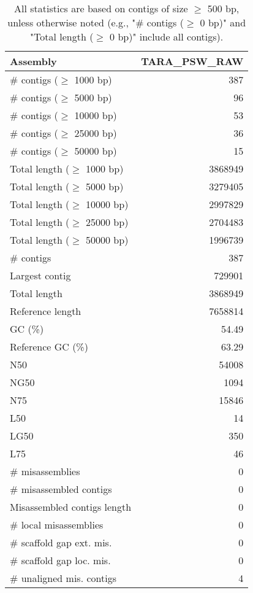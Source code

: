 \documentclass[12pt,a4paper]{article}
\begin{document}
\begin{table}[ht]
\begin{center}
\caption{All statistics are based on contigs of size $\geq$ 500 bp, unless otherwise noted (e.g., "\# contigs ($\geq$ 0 bp)" and "Total length ($\geq$ 0 bp)" include all contigs).}
\begin{tabular}{|l*{1}{|r}|}
\hline
Assembly & TARA\_PSW\_RAW \\ \hline
\# contigs ($\geq$ 1000 bp) & 387 \\ \hline
\# contigs ($\geq$ 5000 bp) & 96 \\ \hline
\# contigs ($\geq$ 10000 bp) & 53 \\ \hline
\# contigs ($\geq$ 25000 bp) & 36 \\ \hline
\# contigs ($\geq$ 50000 bp) & 15 \\ \hline
Total length ($\geq$ 1000 bp) & 3868949 \\ \hline
Total length ($\geq$ 5000 bp) & 3279405 \\ \hline
Total length ($\geq$ 10000 bp) & 2997829 \\ \hline
Total length ($\geq$ 25000 bp) & 2704483 \\ \hline
Total length ($\geq$ 50000 bp) & 1996739 \\ \hline
\# contigs & 387 \\ \hline
Largest contig & 729901 \\ \hline
Total length & 3868949 \\ \hline
Reference length & 7658814 \\ \hline
GC (\%) & 54.49 \\ \hline
Reference GC (\%) & 63.29 \\ \hline
N50 & 54008 \\ \hline
NG50 & 1094 \\ \hline
N75 & 15846 \\ \hline
L50 & 14 \\ \hline
LG50 & 350 \\ \hline
L75 & 46 \\ \hline
\# misassemblies & 0 \\ \hline
\# misassembled contigs & 0 \\ \hline
Misassembled contigs length & 0 \\ \hline
\# local misassemblies & 0 \\ \hline
\# scaffold gap ext. mis. & 0 \\ \hline
\# scaffold gap loc. mis. & 0 \\ \hline
\# unaligned mis. contigs & 4 \\ \hline

\end{tabular}
\end{center}
\end{table}
\end{document}
